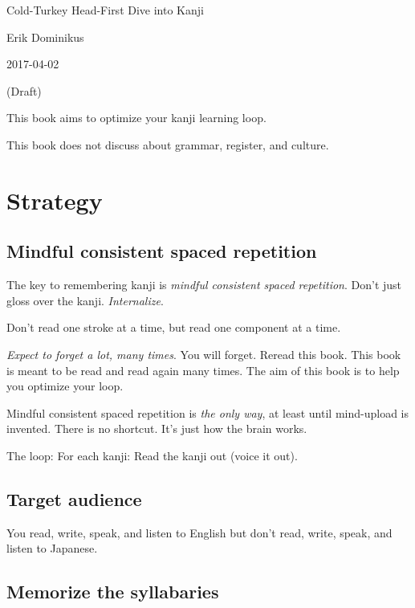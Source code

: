 \documentclass[12pt,openany]{book}
\begin{document}
\frontmatter
{}
{}
\begin{titlepage}
{%
    \setlength\parindent{0em}%
    {\Large Cold-Turkey Head-First Dive into Kanji}\par\vspace{2em}
    Erik Dominikus\par
    2017-04-02\par
    (Draft)\par\vfill
    {\small
        This book aims to optimize your kanji learning loop.

        This book does not discuss about grammar, register, and culture.
    }
}
\end{titlepage}
{}
\tableofcontents
\mainmatter
\chapter{Strategy}

\section{Mindful consistent spaced repetition}

The key to remembering kanji is
\emph{mindful consistent spaced repetition}.
Don't just gloss over the kanji.
\emph{Internalize}.

Don't read one stroke at a time,
but read one component at a time.

\emph{Expect to forget a lot, many times}.
You will forget.
Reread this book.
This book is meant to be read and read again many times.
The aim of this book is to help you optimize your loop.

Mindful consistent spaced repetition is \emph{the only way},
at least until mind-upload is invented.
There is no shortcut.
It's just how the brain works.

The loop:
For each kanji:
Read the kanji out (voice it out).

\section{Target audience}

You read, write, speak, and listen to English but don't read, write, speak, and listen to Japanese.

\section{Memorize the syllabaries}
\end{document}
